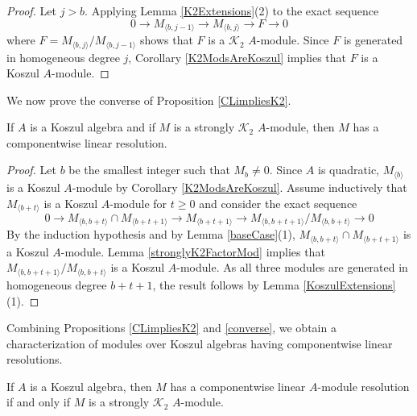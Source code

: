 \documentclass[11pt,righttag]{amsart}
\begin{document}
\begin{proof} Let $j>b$.
Applying Lemma \ref{K2Extensions}(2) to the exact sequence
$$0\rightarrow M_{{\langle} b,j-1{\rangle}}\rightarrow M_{{\langle} b,j{\rangle}}\rightarrow F\rightarrow 0$$ 
where $F=M_{{\langle} b,j{\rangle}}/M_{{\langle} b,j-1{\rangle}}$ shows that $F$ is a ${{\mathcal K}}_2$ $A$-module.  Since $F$ is generated in homogeneous degree $j$, Corollary \ref{K2ModsAreKoszul} implies that $F$ is a Koszul $A$-module.

\end{proof}

We now prove the converse of Proposition \ref{CLimpliesK2}.

\begin{prop}
\label{converse}
If $A$ is a Koszul algebra and if $M$ is a strongly ${{\mathcal K}}_2$ $A$-module, then $M$ has a componentwise linear resolution.
\end{prop}

\begin{proof}
Let $b$ be the smallest integer such that $M_b\neq 0$.
Since $A$ is quadratic, $M_{{\langle} b{\rangle}}$ is a Koszul $A$-module by Corollary \ref{K2ModsAreKoszul}. Assume inductively that $M_{{\langle} b+t{\rangle}}$ is a Koszul $A$-module for $t\ge 0$ and 
consider the exact sequence
$$0\rightarrow M_{{\langle} b,b+t{\rangle}}\cap M_{{\langle} b+t+1{\rangle}}\rightarrow M_{{\langle} b+t+1{\rangle}}\rightarrow M_{{\langle} b,b+t+1{\rangle}}/M_{{\langle} b,b+t{\rangle}}\rightarrow 0$$
 By the induction hypothesis and by Lemma \ref{baseCase}(1), ${M_{{\langle} b,b+t{\rangle}}\cap M_{{\langle} b+t+1{\rangle}}}$ is a Koszul $A$-module. Lemma \ref{stronglyK2FactorMod} implies that $M_{{\langle} b,b+t+1{\rangle}}/M_{{\langle} b,b+t{\rangle}}$ is a Koszul $A$-module. As all three modules are generated in homogeneous degree $b+t+1$, the result follows by Lemma \ref{KoszulExtensions}(1).

\end{proof}

Combining Propositions \ref{CLimpliesK2} and \ref{converse}, we obtain a characterization of modules over Koszul algebras having componentwise linear resolutions.

\begin{cor}
If $A$ is a Koszul algebra, then $M$ has a componentwise linear $A$-module resolution if and only if $M$ is a strongly ${{\mathcal K}}_2$ $A$-module.
\end{cor}

\bigskip
\end{document}
